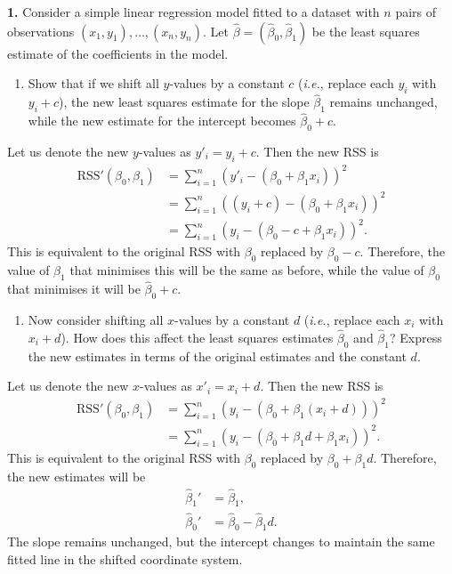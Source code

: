 \documentclass[
  a4paper,
]{article}
\providecommand{\tightlist}{%
  \setlength{\itemsep}{0pt}\setlength{\parskip}{0pt}}
\theoremstyle{definition}
\theoremstyle{definition}
\theoremstyle{definition}
\theoremstyle{definition}
\theoremstyle{remark}
\begin{document}
\textbf{1.} Consider a simple linear regression model fitted to a dataset with \(n\)
pairs of observations \((x_1, y_1), \ldots, (x_n, y_n)\).
Let \(\hat\beta = (\hat\beta_0, \hat\beta_1)\) be the least squares estimate
of the coefficients in the model.

\begin{enumerate}
\def\labelenumi{\alph{enumi}.}
\tightlist
\item
  Show that if we shift all \(y\)-values by a constant \(c\) (\emph{i.e.}, replace
  each \(y_i\) with \(y_i+c\)), the new least squares estimate for the slope
  \(\hat\beta_1\) remains unchanged, while the new estimate for the intercept
  becomes \(\hat\beta_0+c\).
\end{enumerate}

\begin{myanswers}
Let us denote the new \(y\)-values as \(y'_i = y_i + c\).
Then the new RSS is
\begin{align*}
    \text{RSS}'(\beta_0, \beta_1)
    &= \sum_{i=1}^n (y'_i - (\beta_0 + \beta_1 x_i))^2 \\
    &= \sum_{i=1}^n ((y_i + c) - (\beta_0 + \beta_1 x_i))^2 \\
    &= \sum_{i=1}^n (y_i - (\beta_0 - c + \beta_1 x_i))^2.
  \end{align*}
This is equivalent to the original RSS with \(\beta_0\) replaced by
\(\beta_0 - c\). Therefore, the value of \(\beta_1\) that minimises this will
be the same as before, while the value of \(\beta_0\) that minimises it will
be \(\hat\beta_0+c\).

\end{myanswers}

\begin{enumerate}
\def\labelenumi{\alph{enumi}.}
\setcounter{enumi}{1}
\tightlist
\item
  Now consider shifting all \(x\)-values by a constant \(d\) (\emph{i.e.}, replace
  each \(x_i\) with \(x_i+d\)). How does this affect the least squares estimates
  \(\hat\beta_0\) and \(\hat\beta_1\)? Express the new estimates in terms of the
  original estimates and the constant \(d\).
\end{enumerate}

\begin{myanswers}
Let us denote the new \(x\)-values as \(x'_i = x_i + d\).
Then the new RSS is
\begin{align*}
    \text{RSS}'(\beta_0, \beta_1)
    &= \sum_{i=1}^n (y_i - (\beta_0 + \beta_1 (x_i + d)))^2 \\
    &= \sum_{i=1}^n (y_i - (\beta_0 + \beta_1 d + \beta_1 x_i))^2.
  \end{align*}
This is equivalent to the original RSS with \(\beta_0\) replaced by
\(\beta_0 + \beta_1 d\). Therefore, the new estimates will be
\begin{align*}
    \hat\beta_1' &= \hat\beta_1, \\
    \hat\beta_0' &= \hat\beta_0 - \hat\beta_1 d.
  \end{align*}
The slope remains unchanged, but the intercept changes to maintain the
same fitted line in the shifted coordinate system.

\end{myanswers}
\end{document}
